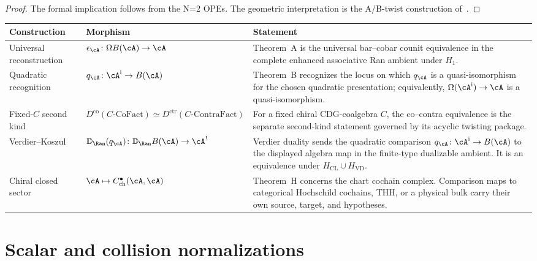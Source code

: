 \begin{proof}
The formal implication follows from the N=2 OPEs.  The geometric
interpretation is the A/B-twist construction of~\cite{Witten91}.
\end{proof}

\begin{center}
\renewcommand{\arraystretch}{1.35}
\begin{tabular}{|p{3.0cm}|p{4.0cm}|p{6.5cm}|}
\hline
\textbf{Construction} & \textbf{Morphism} & \textbf{Statement} \\
\hline\hline
Universal reconstruction &
$\epsilon_\cA\colon\Omega B(\cA)\to\cA$ &
Theorem~A is the universal bar--cobar counit equivalence in the
complete enhanced associative Ran ambient under $H_1$. \\
\hline
Quadratic recognition &
$q_\cA\colon\cA^{\mathrm i}\to B(\cA)$ &
Theorem~B recognizes the locus on which $q_\cA$ is a
quasi-isomorphism for the chosen quadratic presentation; equivalently,
$\Omega(\cA^{\mathrm i})\to\cA$ is a quasi-isomorphism. \\
\hline
Fixed-$C$ second kind &
$D^{\mathrm{co}}(C\text{-}\mathrm{CoFact})\simeq
D^{\mathrm{ctr}}(C\text{-}\mathrm{ContraFact})$ &
For a fixed chiral CDG-coalgebra $C$, the co--contra equivalence is the
separate second-kind statement governed by its acyclic twisting
package. \\
\hline
Verdier--Koszul &
$\mathbb D_{\Ran}(q_\cA)\colon
\mathbb D_{\Ran}B(\cA)\to\cA^!$ &
Verdier duality sends the quadratic comparison
$q_\cA\colon\cA^{\mathrm i}\to B(\cA)$ to the displayed algebra map
in the finite-type dualizable ambient.  It is an equivalence under
$H_{\mathrm{CL}}\cup H_{\mathrm{VD}}$. \\
\hline
Chiral closed sector & $\cA\mapsto C^\bullet_{\mathrm{ch}}(\cA,\cA)$ &
Theorem~H concerns the chart cochain complex.  Comparison maps to
categorical Hochschild cochains, THH, or a physical bulk carry their
own source, target, and hypotheses. \\
\hline
\end{tabular}
\end{center}

\section{Scalar and collision normalizations}
\label{sec:master-concordance-normalizations}

